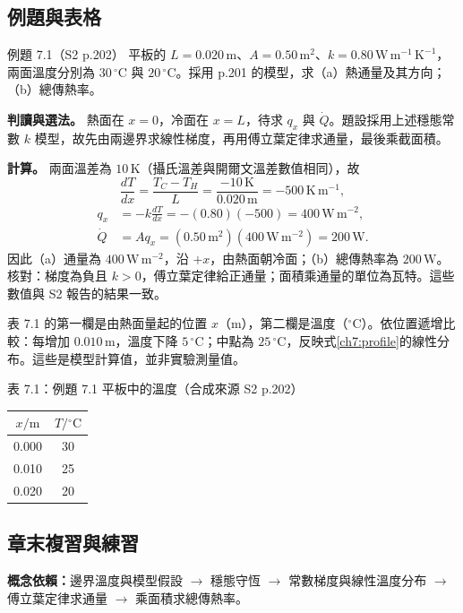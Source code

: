 \newpage
\subsection{例題與表格}\label{ch7:example}
\begin{examplebox}{例題 7.1（S2 p.202）}
平板的 $L=0.020\,\mathrm m$、$A=0.50\,\mathrm{m^2}$、$k=0.80\,\mathrm{W\,m^{-1}\,K^{-1}}$，兩面溫度分別為 $30\,{}^\circ\mathrm C$ 與 $20\,{}^\circ\mathrm C$。採用 p.201 的模型，求（a）熱通量及其方向；（b）總傳熱率。

\textbf{判讀與選法。} 熱面在 $x=0$，冷面在 $x=L$，待求 $q_x$ 與 $\dot Q$。題設採用上述穩態常數 $k$ 模型，故先由兩邊界求線性梯度，再用傅立葉定律求通量，最後乘截面積。

\textbf{計算。} 兩面溫差為 $10\,\mathrm K$（攝氏溫差與開爾文溫差數值相同），故
\[
\frac{dT}{dx}=\frac{T_C-T_H}{L}=\frac{-10\,\mathrm K}{0.020\,\mathrm m}=-500\,\mathrm{K\,m^{-1}},
\]
\[
\begin{aligned}
q_x&=-k\frac{dT}{dx}=-(0.80)(-500)=400\,\mathrm{W\,m^{-2}},\\
\dot Q&=Aq_x=(0.50\,\mathrm{m^2})(400\,\mathrm{W\,m^{-2}})=200\,\mathrm W.
\end{aligned}
\]
因此（a）通量為 $400\,\mathrm{W\,m^{-2}}$，沿 $+x$，由熱面朝冷面；（b）總傳熱率為 $200\,\mathrm W$。核對：梯度為負且 $k>0$，傅立葉定律給正通量；面積乘通量的單位為瓦特。這些數值與 S2 報告的結果一致。
\end{examplebox}

表 7.1 的第一欄是由熱面量起的位置 $x$（m），第二欄是溫度（$^\circ$C）。依位置遞增比較：每增加 $0.010\,\mathrm m$，溫度下降 $5\,{}^\circ\mathrm C$；中點為 $25\,{}^\circ\mathrm C$，反映式\eqref{ch7:profile}的線性分布。這些是模型計算值，並非實驗測量值。
\begin{center}
表 7.1：例題 7.1 平板中的溫度（合成來源 S2 p.202）\\[3pt]
\begin{tabular}{cc}\toprule
$x/\mathrm m$ & $T/{}^\circ\mathrm C$\\\midrule
0.000 & 30\\ 0.010 & 25\\ 0.020 & 20\\\bottomrule
\end{tabular}
\end{center}

\subsection{章末複習與練習}\label{ch7:review}
\textbf{概念依賴：}邊界溫度與模型假設 $\to$ 穩態守恆 $\to$ 常數梯度與線性溫度分布 $\to$ 傅立葉定律求通量 $\to$ 乘面積求總傳熱率。

